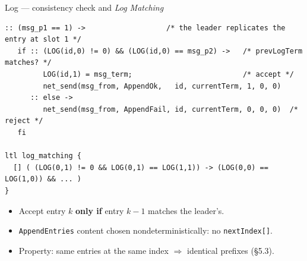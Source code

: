 \documentclass{beamer}
\begin{document}
\begin{frame}[fragile]{Log — consistency check and \emph{Log Matching}}
\begin{lstlisting}[style=promela]
:: (msg_p1 == 1) ->                   /* the leader replicates the entry at slot 1 */
   if :: (LOG(id,0) != 0) && (LOG(id,0) == msg_p2) ->   /* prevLogTerm matches? */
         LOG(id,1) = msg_term;                          /* accept */
         net_send(msg_from, AppendOk,   id, currentTerm, 1, 0, 0)
      :: else ->
         net_send(msg_from, AppendFail, id, currentTerm, 0, 0, 0)  /* reject */
   fi

ltl log_matching {
  [] ( (LOG(0,1) != 0 && LOG(0,1) == LOG(1,1)) -> (LOG(0,0) == LOG(1,0)) && ... )
}
\end{lstlisting}
  \begin{itemize}
    \item Accept entry $k$ \textbf{only if} entry $k{-}1$ matches the leader's.
    \item \texttt{AppendEntries} content chosen nondeterministically: no \texttt{nextIndex[]}.
    \item Property: same entries at the same index $\Rightarrow$ identical prefixes (§5.3).
  \end{itemize}
\end{frame}



\end{document}

